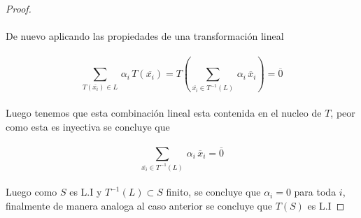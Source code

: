 \documentclass[11pt]{article}
\numberwithin{equation}{section}
\begin{document}
\begin{proof}
\begin{equation*}
    \end{equation*}\,\\
    De nuevo aplicando las propiedades de una transformaci\'on lineal\,\\
    \,\\
    \begin{equation*}
        \sum_{T(\overline{x_i})\in L}\,\alpha_i\,T(\overline{x_i})= T\left(\sum_{\overline{x_i}\in T^{-1}(L)}\,\alpha_i\,\overline{x}_i\right)=\overline{0}
    \end{equation*}\,\\
    Luego tenemos que esta combinaci\'on lineal esta contenida en el nucleo de $T$, peor como esta es inyectiva se concluye que\,\\
    \,\\
    \begin{equation*}
        \sum_{\overline{x_i}\in T^{-1}(L)}\,\alpha_i\,\overline{x}_i=\overline{0}
    \end{equation*}\,\\
    Luego como $S$ es L.I y $T^{-1}(L)\subset S$ finito, se concluye que $\alpha_i=0$ para toda $i$, finalmente de manera analoga
    al caso anterior se concluye que $T(S)$ es L.I
\end{proof}\,\\
\end{document}
